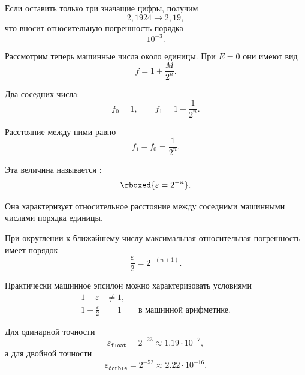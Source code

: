 \documentclass[../final.tex]{subfiles}
\begin{document}
Если оставить только три значащие цифры, получим
%
\[
    2{,}1924
    \longrightarrow
    2{,}19,
\]
%
что вносит относительную погрешность порядка
%
\[
    10^{-3}.
\]

Рассмотрим теперь машинные числа около единицы.
При $E=0$ они имеют вид
%
\begin{equation*}
    f
    =
    1+\frac{M}{2^n}.
\end{equation*}

Два соседних числа:
%
\begin{equation*}
    f_0=1,
    \qquad
    f_1
    =
    1+\frac{1}{2^n}.
\end{equation*}

Расстояние между ними равно
%
\begin{equation*}
    f_1-f_0
    =
    \frac{1}{2^n}.
\end{equation*}

Эта величина называется :
%
\begin{equation*}
    \rboxed{
        \varepsilon
        =
        2^{-n}
    }.
\end{equation*}

Она характеризует относительное расстояние между соседними
машинными числами порядка единицы.

При округлении к ближайшему числу максимальная относительная
погрешность имеет порядок
%
\begin{equation*}
    \frac{\varepsilon}{2}
    =
    2^{-(n+1)}.
\end{equation*}

Практически машинное эпсилон можно характеризовать условиями
%
\begin{align*}
    1+\varepsilon
    &\neq
    1,
    \\[3pt]
    1+\frac{\varepsilon}{2}
    &=
    1
    \qquad
    \text{в машинной арифметике}.
\end{align*}

Для одинарной точности
%
\begin{equation*}
    \varepsilon_{\texttt{float}}
    =
    2^{-23}
    \approx
    1.19\cdot10^{-7},
\end{equation*}
%
а для двойной точности
%
\begin{equation*}
    \varepsilon_{\texttt{double}}
    =
    2^{-52}
    \approx
    2.22\cdot10^{-16}.
\end{equation*}
\end{document}
